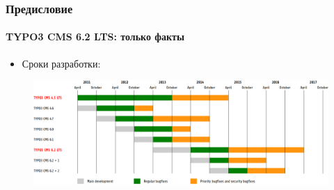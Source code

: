 
\begin{frame}[fragile]
	\frametitle{Предисловие}
	\framesubtitle{TYPO3 CMS 6.2 LTS: только факты}

	\begin{itemize}
		\item Сроки разработки:
	\end{itemize}

	\begin{figure}
		\includegraphics[width=0.99\linewidth]{Images/Introduction/ReleaseAgenda.png}
	\end{figure}

\end{frame}


